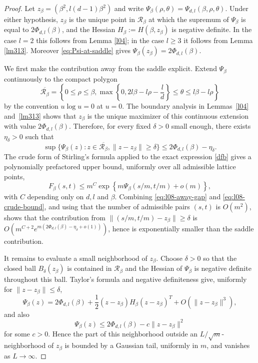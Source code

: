 \documentclass[11pt]{amsart}
\theoremstyle{plain}
\numberwithin{equation}{section}
\numberwithin{theorem}{section}
\numberwithin{figure}{section}
\begin{document}
\begin{proof}
Let $z_\beta=(\beta^2,l(d-1)\beta^2)$ and write
$\Psi_\beta(\rho,\theta)=\Psi_{d,l}(\beta,\rho,\theta)$.  Under either hypothesis,
$z_\beta$ is the unique point in $\mathcal R_\beta$ at which the supremum of
$\Psi_\beta$ is equal to $2\Phi_{d,l}(\beta)$, and the Hessian
$H_\beta:=H(\beta,z_\beta)$ is negative definite.  In the case $l=2$ this follows from
Lemma \ref{l04}; in the case $l\ge3$ it follows from Lemma \ref{lm313}.  Moreover
\eqref{eq:Psi-at-saddle} gives $\Psi_\beta(z_\beta)=2\Phi_{d,l}(\beta)$.

We first make the contribution away from the saddle explicit.  Extend
$\Psi_\beta$ continuously to the compact polygon
\[
  \overline{\mathcal R_\beta}=
  \left\{0\le\rho\le\beta,
  \max\left\{0,2l\beta-l\rho-\frac ld\right\}\le \theta\le l\beta-l\rho
  \right\}
\]
by the convention $u\log u=0$ at $u=0$.  The boundary analysis in
Lemmas~\ref{l04} and~\ref{lm313} shows that $z_\beta$ is the unique maximizer of
this continuous extension with value $2\Phi_{d,l}(\beta)$.  Therefore, for every
fixed $\delta>0$ small enough, there exists $\eta_\delta>0$ such that
\begin{equation}\label{eq:l08-away-gap}
  \sup\{\Psi_\beta(z):z\in\overline{\mathcal R_\beta},
        \|z-z_\beta\|\ge\delta\}
  \le 2\Phi_{d,l}(\beta)-\eta_\delta .
\end{equation}
The crude form of Stirling's formula applied to the exact expression \eqref{dfb}
gives a polynomially prefactored upper bound, uniformly over all admissible lattice
points,
\begin{equation}\label{eq:l08-crude-bound}
  F_\beta(s,t)
  \le m^C\exp\left\{m\Psi_\beta(s/m,t/m)+o(m)\right\},
\end{equation}
with $C$ depending only on $d,l$ and $\beta$.  Combining
\eqref{eq:l08-away-gap} and \eqref{eq:l08-crude-bound}, and using that the number of
admissible pairs $(s,t)$ is $O(m^2)$, shows that the contribution from
$\| (s/m,t/m)-z_\beta\|\ge\delta$ is
$O(m^{C+2}e^{m(2\Phi_{d,l}(\beta)-\eta_\delta+o(1))})$, hence is exponentially
smaller than the saddle contribution.

It remains to evaluate a small neighborhood of $z_\beta$.  Choose $\delta>0$ so that
the closed ball $B_\delta(z_\beta)$ is contained in $\mathcal R_\beta$ and the Hessian
of $\Psi_\beta$ is negative definite throughout this ball.  Taylor's formula and
negative definiteness give, uniformly for $\|z-z_\beta\|\leq\delta$,
\[
\Psi_\beta(z)=2\Phi_{d,l}(\beta)+\frac12(z-z_\beta)H_\beta(z-z_\beta)^T
+O(\|z-z_\beta\|^3),
\]
and also
\[
\Psi_\beta(z)\leq 2\Phi_{d,l}(\beta)-c\|z-z_\beta\|^2
\]
for some $c>0$.  Hence the part of this neighborhood outside an
$L/\sqrt m$-neighborhood of $z_\beta$ is bounded by a Gaussian tail, uniformly in $m$,
and vanishes as $L\to\infty$.


\end{proof}
\end{document}
